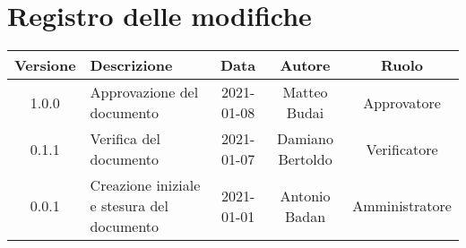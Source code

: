 \section*{Registro delle modifiche}

\begin{center}
	\begin{longtable}{|c|p{5cm}|c|c|c|}
	\hline
	\rowcolor{lighter-grayer}
	\textbf{Versione} & \textbf{Descrizione} & \textbf{Data} & \textbf{Autore} & \textbf{Ruolo} \\
	\hline
	\endfirsthead


	\hline
	1.0.0 & Approvazione del documento & 2021-01-08 & Matteo Budai & Approvatore \\
	\hline
	0.1.1 & Verifica del documento & 2021-01-07 & Damiano Bertoldo & Verificatore \\
	\hline
	0.0.1 & Creazione iniziale e stesura del documento & 2021-01-01 & Antonio Badan & Amministratore \\
	\hline
	\end{longtable}
\end{center}